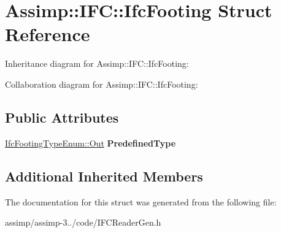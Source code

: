 \hypertarget{struct_assimp_1_1_i_f_c_1_1_ifc_footing}{\section{Assimp\+:\+:I\+F\+C\+:\+:Ifc\+Footing Struct Reference}
\label{struct_assimp_1_1_i_f_c_1_1_ifc_footing}
}


Inheritance diagram for Assimp\+:\+:I\+F\+C\+:\+:Ifc\+Footing\+:


Collaboration diagram for Assimp\+:\+:I\+F\+C\+:\+:Ifc\+Footing\+:
\subsection*{Public Attributes}
\begin{DoxyCompactItemize}
\item 
\hypertarget{struct_assimp_1_1_i_f_c_1_1_ifc_footing_a19dde7f4d7cfe72ea1986ccd8c9e09c2}{\hyperlink{classboost_1_1shared__ptr}{Ifc\+Footing\+Type\+Enum\+::\+Out} {\bfseries Predefined\+Type}}\label{struct_assimp_1_1_i_f_c_1_1_ifc_footing_a19dde7f4d7cfe72ea1986ccd8c9e09c2}

\end{DoxyCompactItemize}
\subsection*{Additional Inherited Members}


The documentation for this struct was generated from the following file\+:\begin{DoxyCompactItemize}
\item 
assimp/assimp-\/3../code/I\+F\+C\+Reader\+Gen.\+h\end{DoxyCompactItemize}
